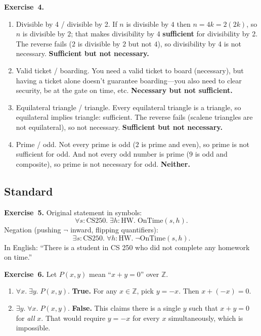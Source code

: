 \documentclass[11pt]{article}
\begin{document}
\medskip
\textbf{Exercise~4.}
\begin{enumerate}[label=(\alph*)]
  \item Divisible by 4 / divisible by 2. If $n$ is divisible by $4$ then $n = 4k = 2(2k)$, so $n$ is divisible by $2$; that makes divisibility by 4 \textbf{sufficient} for divisibility by 2. The reverse fails ($2$ is divisible by $2$ but not $4$), so divisibility by 4 is not necessary. \textbf{Sufficient but not necessary.}
  \item Valid ticket / boarding. You need a valid ticket to board (necessary), but having a ticket alone doesn't guarantee boarding---you also need to clear security, be at the gate on time, etc. \textbf{Necessary but not sufficient.}
  \item Equilateral triangle / triangle. Every equilateral triangle is a triangle, so equilateral implies triangle: sufficient. The reverse fails (scalene triangles are not equilateral), so not necessary. \textbf{Sufficient but not necessary.}
  \item Prime / odd. Not every prime is odd ($2$ is prime and even), so prime is not sufficient for odd. And not every odd number is prime ($9$ is odd and composite), so prime is not necessary for odd. \textbf{Neither.}
\end{enumerate}

\subsection*{Standard}

\textbf{Exercise~5.}
Original statement in symbols:
\[
  \forall s : \text{CS250}.\;\exists h : \text{HW}.\;\text{OnTime}(s, h).
\]
Negation (pushing $\lnot$ inward, flipping quantifiers):
\[
  \exists s : \text{CS250}.\;\forall h : \text{HW}.\;\lnot\text{OnTime}(s, h).
\]
In English: ``There is a student in CS 250 who did not complete any homework
on time.''

\medskip
\textbf{Exercise~6.}
Let $P(x,y)$ mean ``$x + y = 0$'' over $\mathbb{Z}$.
\begin{enumerate}[label=(\alph*)]
  \item $\forall x.\;\exists y.\;P(x,y)$.
        \textbf{True.}  For any $x \in \mathbb{Z}$, pick $y = -x$.
        Then $x + (-x) = 0$.

  \item $\exists y.\;\forall x.\;P(x,y)$.
        \textbf{False.}  This claims there is a single $y$ such that
        $x + y = 0$ for \emph{all} $x$.  That would require $y = -x$ for
        every $x$ simultaneously, which is impossible.
\end{enumerate}
\end{document}
